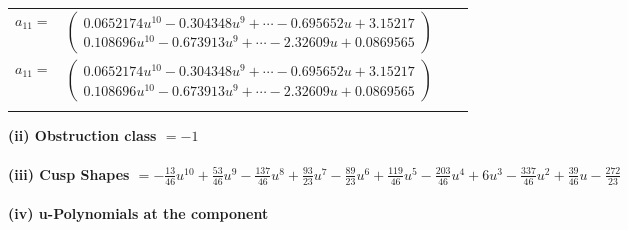 \documentclass[1p]{elsarticle_modified}
\theoremstyle{definition}
\begin{document}
\begin{tabular}{m{7pt} m{180pt} m{7pt} m{180pt} }
\flushright $a_{11}=$&$\begin{pmatrix}0.0652174 u^{10}-0.304348 u^{9}+\cdots-0.695652 u+3.15217\\0.108696 u^{10}-0.673913 u^{9}+\cdots-2.32609 u+0.0869565\end{pmatrix}$\\ \flushright $a_{11}=$&$\begin{pmatrix}0.0652174 u^{10}-0.304348 u^{9}+\cdots-0.695652 u+3.15217\\0.108696 u^{10}-0.673913 u^{9}+\cdots-2.32609 u+0.0869565\end{pmatrix}$\\&\end{tabular}
\flushleft \textbf{(ii) Obstruction class $= -1$}\\~\\
\flushleft \textbf{(iii) Cusp Shapes $= -\frac{13}{46} u^{10}+\frac{53}{46} u^9-\frac{137}{46} u^8+\frac{93}{23} u^7-\frac{89}{23} u^6+\frac{119}{46} u^5-\frac{203}{46} u^4+6 u^3-\frac{337}{46} u^2+\frac{39}{46} u-\frac{272}{23}$}\\~\\
\newpage\renewcommand{\arraystretch}{1}
\flushleft \textbf{(iv) u-Polynomials at the component}\newline \\
\end{document}
